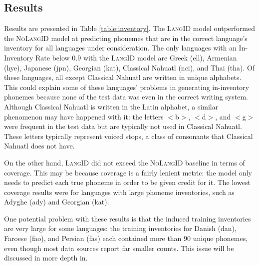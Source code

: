 \subsection{Results}
Results are presented in Table \ref{table:inventory}. The \textsc{LangID} model outperformed the \textsc{NoLangID} model at predicting phonemes that are in the correct language's inventory for all languages under consideration. The only languages with an In-Inventory Rate below 0.9 with the \textsc{LangID} model are Greek (ell), Armenian (hye), Japanese (jpn), Georgian (kat), Classical Nahuatl (nci), and Thai (tha). Of these languages, all except Classical Nahuatl are written in unique alphabets. This could explain some of these languages' problems in generating in-inventory phonemes because none of the test data was even in the correct writing system. Although Classical Nahuatl is written in the Latin alphabet, a similar phenomenon may have happened with it: the letters $<$b$>$, $<$d$>$, and $<$g$>$ were frequent in the test data but are typically not used in Classical Nahuatl. These letters typically represent voiced stops, a class of consonants that Classical Nahuatl does not have.

On the other hand, \textsc{LangID} did not exceed the \textsc{NoLangID} baseline in terms of coverage. This may be because coverage is a fairly lenient metric: the model only needs to predict each true phoneme in order to be given credit for it. The lowest coverage results were for languages with large phoneme inventories, such as Adyghe (ady) and Georgian (kat).

One potential problem with these results is that the induced training inventories are very large for some languages: the training inventories for Danish (dan), Faroese (fao), and Persian (fas) each contained more than 90 unique phonemes, even though most data sources  report far smaller counts. This issue will be discussed in more depth in.

